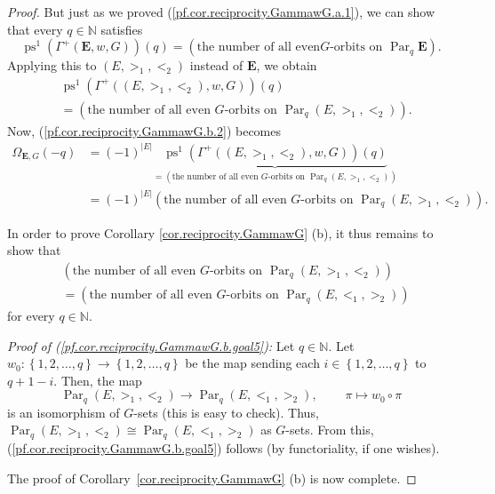 \documentclass[12pt]{article}
\theoremstyle{plain}
\theoremstyle{definition}
\theoremstyle{remark}
\newcommand{\Par}{\operatorname{Par}}
\newcommand{\EE}{{\mathbf{E}}}
\newcommand{\NN}{{\mathbb{N}}}
\begin{document}
\begin{proof}
But just as we proved (\ref{pf.cor.reciprocity.GammawG.a.1}), we can show that
every $q\in \NN $ satisfies
\[
\operatorname{ps}^{1}\left(  \Gamma^{+}\left( \EE ,
w,G\right)  \right)  \left(  q\right)  =\left(  \text{the number of all even
}G\text{-orbits on } \Par_q \EE \right)  .
\]
Applying this to $\left(  E,>_{1},<_{2}\right)  $ instead of $\mathbf{E}$, we
obtain%
\begin{align*}
&  \operatorname{ps}^{1}\left(  \Gamma^{+}\left(  \left(
E,>_{1},<_{2}\right)  ,w,G\right)  \right)  \left(  q\right) \\
&  =\left(  \text{the number of all even }G\text{-orbits on }%
\Par_q \left(  E,>_{1},<_{2}\right)  \right)  .
\end{align*}
Now, (\ref{pf.cor.reciprocity.GammawG.b.2}) becomes%
\begin{align*}
\Omega_{\EE, G}\left(  -q\right)   &  =\left(  -1\right)  ^{\left\vert
E\right\vert }\underbrace{\operatorname{ps}^{1}\left(  \Gamma
^{+}\left(  \left(  E,>_{1},<_{2}\right)  ,w,G\right)  \right)  \left(
q\right)  }_{=\left(  \text{the number of all even }G\text{-orbits on }
\Par_q \left(  E,>_{1},<_{2}\right)  \right)  }\\
&  =\left(  -1\right)  ^{\left\vert E\right\vert }\left(  \text{the number of
all even }G\text{-orbits on }
\Par_q \left( E,>_{1},<_{2}\right)  \right)  .
\end{align*}


In order to prove Corollary \ref{cor.reciprocity.GammawG} (b), it thus remains
to show that
\begin{align}
&  \left(  \text{the number of all even }G\text{-orbits on }%
\Par_{q} \left(  E,>_{1},<_{2}\right)  \right)
\nonumber\\
&  =\left(  \text{the number of all even }G\text{-orbits on }%
\Par_{q} \left(  E,<_{1},>_{2}\right)  \right)
\label{pf.cor.reciprocity.GammawG.b.goal5}
\end{align}
for every $q\in \NN $.

\textit{Proof of (\ref{pf.cor.reciprocity.GammawG.b.goal5}):} Let
$q\in \NN $. Let $w_{0}:\left\{  1,2,\ldots,q\right\}  \rightarrow
\left\{  1,2,\ldots,q\right\}  $ be the map sending each $i\in\left\{
1,2,\ldots,q\right\}  $ to $q+1-i$. Then, the map
\[
 \Par_q \left(  E,>_{1},<_{2}\right)  \rightarrow
 \Par_q \left(  E,<_{1},>_{2}\right)
,\ \ \ \ \ \ \ \ \ \ \pi\mapsto w_{0}\circ\pi
\]
is an isomorphism of $G$-sets (this is easy to check). Thus,
$\Par_q \left(  E,>_{1},<_{2}\right)  \cong
 \Par_q \left(  E,<_{1},>_{2}\right)  $ as $G$-sets.
From this, (\ref{pf.cor.reciprocity.GammawG.b.goal5}) follows (by
functoriality, if one wishes).

The proof of Corollary~\ref{cor.reciprocity.GammawG} (b) is now complete.
\end{proof}
\end{document}
